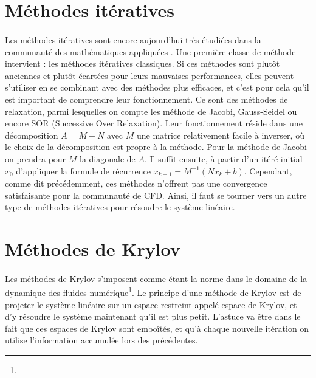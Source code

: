 \section{Méthodes itératives}

	\paragraph{}
	Les méthodes itératives sont encore aujourd'hui très étudiées dans la communauté des mathématiques appliquées \cite{OlshanskiiTyrtyshnikov2014, Saad2003, TrefethenBau1997}.
	Une première classe de méthode intervient : les méthodes itératives classiques.
	Si ces méthodes sont plutôt anciennes et plutôt écartées pour leurs mauvaises performances, elles peuvent s'utiliser en se combinant avec des méthodes plus efficaces, et c'est pour cela qu'il est important de comprendre leur fonctionnement.
	Ce sont des méthodes de relaxation, parmi lesquelles on compte les méthode de Jacobi, Gauss-Seidel ou encore SOR (Successive Over Relaxation).
	Leur fonctionnement réside dans une décomposition $A = M - N$ avec $M$ une matrice relativement facile à inverser, où le choix de la décomposition est propre à la méthode.
	Pour la méthode de Jacobi on prendra pour $M$ la diagonale de $A$.
	Il suffit ensuite, à partir d'un itéré initial $x_0$ d'appliquer la formule de récurrence $x_{k+1} = M^{-1}\left(Nx_k + b\right)$.
	Cependant, comme dit précédemment, ces méthodes n'offrent pas une convergence satisfaisante pour la communauté de CFD.
	Ainsi, il faut se tourner vers un autre type de méthodes itératives pour résoudre le système linéaire.


\section{Méthodes de Krylov}

	\paragraph{}
	Les méthodes de Krylov s'imposent comme étant la norme dans le domaine de la dynamique des fluides numérique\footnote{}.
	Le principe d'une méthode de Krylov est de projeter le système linéaire sur un espace restreint appelé espace de Krylov, et d'y résoudre le système maintenant qu'il est plus petit.
	L'astuce va être dans le fait que ces espaces de Krylov sont emboîtés, et qu'à chaque nouvelle itération on utilise l'information accumulée lors des précédentes.

